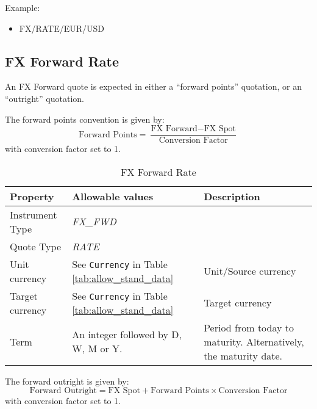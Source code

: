 Example:
\begin{itemize}
\item {FX/RATE/EUR/USD}
\end{itemize}

\subsection{FX Forward Rate}
\label{ss:fx_forward_rate}

An FX Forward quote is expected in either a ``forward points'' quotation, or an ``outright'' quotation. 

The forward points convention is given by:
$$
\mbox{Forward Points} = \frac{\mbox{FX Forward} - \mbox{FX
    Spot}}{\mbox{Conversion Factor}}
$$ 
with conversion factor set to 1.

\begin{table}[H]
\centering
  \begin{tabular}{|p{3.5cm}|p{3.5cm}|p{6.5cm}|}
  \hline
    {\bf Property} & {\bf Allowable values} & {\bf Description}\\ \hline
    Instrument Type & \emph{FX\_FWD} & \\ \hline
    Quote Type & \emph{RATE} & \\ \hline
    Unit currency & See \lstinline!Currency! in Table \ref{tab:allow_stand_data} & Unit/Source currency\\ \hline
    Target currency & See \lstinline!Currency! in Table   \ref{tab:allow_stand_data} & Target currency\\  \hline
    Term & An integer followed by D, W, M or Y. & Period from today to  maturity. Alternatively, the maturity date.\\ \hline
  \end{tabular}
  \caption{FX Forward Rate}
  \label{tab:fxfwd_quote}
\end{table}

The forward outright is given by:
$$
\mbox{Forward Outright} = \mbox{FX Spot} + \mbox{Forward Points}\times{\mbox{Conversion Factor}}
$$ 
with conversion factor set to 1.

